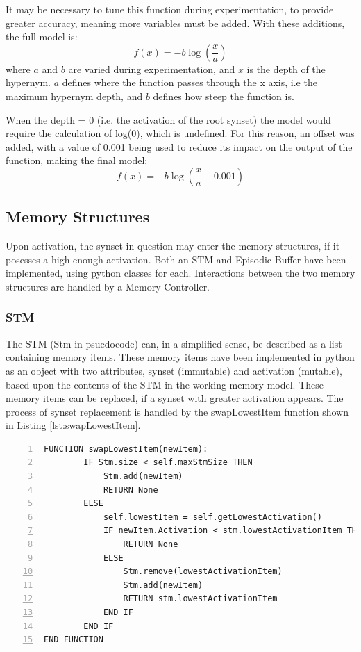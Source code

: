 \documentclass[]{article}
\begin{document}
It may be necessary to tune this function during experimentation, to provide greater accuracy, meaning more variables must be added. With these additions, the full model is:
\[f(x) = -b\log(\frac{x}{a})\]
where $a$ and $b$ are varied during experimentation, and $x$ is the depth of the hypernym. $a$ defines where the function passes through the x axis, i.e the maximum hypernym depth, and $b$ defines how steep the function is.

When the depth = 0 (i.e. the activation of the root synset) the model would require the calculation of log(0), which is undefined. For this reason, an offset was added, with a value of 0.001 being used to reduce its impact on the output of the function, making the final model:
\[f(x) = -b\log(\frac{x}{a}+0.001)\]


\subsection{Memory Structures}
\label{sec:ImplementedMemoryStructures}

Upon activation, the synset in question may enter the memory structures, if it posesses a high enough activation. Both an STM and Episodic Buffer have been implemented, using python classes for each. Interactions between the two memory structures are handled by a Memory Controller. 

\subsubsection{STM}
\label{sec:ImplementedSTM}

The STM (Stm in psuedocode) can, in a simplified sense, be described as a list containing memory items. These memory items have been implemented in python as an object with two attributes, synset (immutable) and activation (mutable), based upon the contents of the STM in the working memory model. These memory items can be replaced, if a synset with greater activation appears. The process of synset replacement is handled by the swapLowestItem function shown in Listing \ref{lst:swapLowestItem}.

\begin{lstlisting}[numbers=left, numberstyle=\small, caption={the swapLowestItem function}, captionpos=b, label={lst:swapLowestItem}]
FUNCTION swapLowestItem(newItem):
        IF Stm.size < self.maxStmSize THEN
            Stm.add(newItem)
            RETURN None
        ELSE
            self.lowestItem = self.getLowestActivation()
            IF newItem.Activation < stm.lowestActivationItem THEN
                RETURN None
            ELSE
                Stm.remove(lowestActivationItem)
                Stm.add(newItem)
                RETURN stm.lowestActivationItem
            END IF
        END IF
END FUNCTION
\end{lstlisting}
\end{document}
